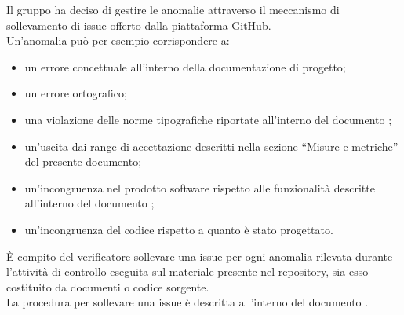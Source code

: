 
		Il gruppo ha deciso di gestire le anomalie attraverso il meccanismo di sollevamento di issue offerto dalla piattaforma GitHub.\\
		Un'anomalia può per esempio corrispondere a:
		\begin{itemize}
			\item un errore concettuale all'interno della documentazione di progetto;
			\item un errore ortografico;
			\item una violazione delle norme tipografiche riportate all'interno del documento ;
			\item un'uscita dai range di accettazione descritti nella sezione “Misure e metriche” del presente documento;
			\item un'incongruenza nel prodotto software rispetto alle funzionalità descritte all'interno del documento ;
			\item un'incongruenza del codice rispetto a quanto è stato progettato.
		\end{itemize}
		È compito del verificatore sollevare una issue per ogni anomalia rilevata durante l'attività di controllo eseguita sul materiale presente 
		nel repository, sia esso costituito da documenti o codice sorgente.\\
		La procedura per sollevare una issue è descritta all'interno del documento .
